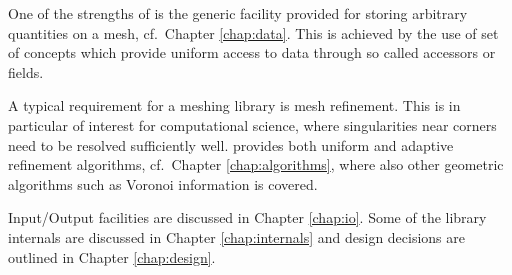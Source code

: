 One of the strengths of {\ViennaGrid} is the generic facility provided for storing arbitrary quantities on a mesh, cf.~Chapter \ref{chap:data}.
This is achieved by the use of set of concepts which provide uniform access to data through so called accessors or fields.

A typical requirement for a meshing library is mesh refinement.
This is in particular of interest for computational science, where singularities near corners need to be resolved sufficiently well.
{\ViennaGrid} provides both uniform and adaptive refinement algorithms, cf.~Chapter \ref{chap:algorithms}, where also other geometric algorithms such as Voronoi information is covered.

Input/Output facilities are discussed in Chapter \ref{chap:io}.
Some of the library internals are discussed in Chapter \ref{chap:internals} and design decisions are outlined in Chapter \ref{chap:design}.

